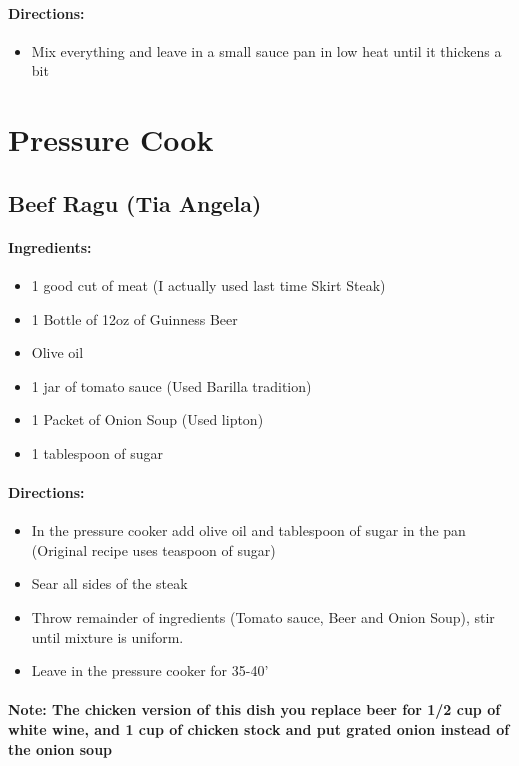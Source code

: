 \documentclass{article}
\begin{document}
\paragraph{Directions:}
\begin{itemize}
	\item Mix everything and leave in a small sauce pan in low heat until it thickens a bit
\end{itemize}

\section{Pressure Cook}

\subsection{Beef Ragu (Tia Angela)}

\paragraph{Ingredients:}

\begin{itemize}
	\item 1 good cut of meat (I actually used last time Skirt Steak)
	\item 1 Bottle of 12oz of Guinness Beer
	\item Olive oil
	\item 1 jar of tomato sauce (Used Barilla tradition)
	\item 1 Packet of Onion Soup (Used lipton)
	\item 1 tablespoon of sugar
\end{itemize}

\paragraph{Directions:}
\begin{itemize}
	\item In the pressure cooker add olive oil and tablespoon of sugar in the pan (Original recipe uses teaspoon of sugar)
	\item Sear all sides of the steak
	\item Throw remainder of ingredients (Tomato sauce, Beer and Onion Soup), stir until mixture is uniform.
	\item Leave in the pressure cooker for 35-40'
\end{itemize}

\paragraph{Note: The chicken version of this dish you replace beer for 1/2 cup of white wine, and 1 cup of chicken stock and put grated onion instead of the onion soup}
\end{document}
